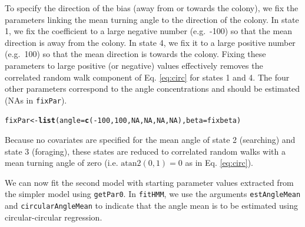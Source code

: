 \documentclass[12pt]{article}\usepackage[]{graphicx}\usepackage[]{color}
\makeatletter
\newcommand{\hlnum}[1]{\textcolor[rgb]{0.686,0.059,0.569}{#1}}%
\newcommand{\hlopt}[1]{\textcolor[rgb]{0,0,0}{#1}}%
\newcommand{\hlstd}[1]{\textcolor[rgb]{0.345,0.345,0.345}{#1}}%
\newcommand{\hlkwb}[1]{\textcolor[rgb]{0.69,0.353,0.396}{#1}}%
\newcommand{\hlkwc}[1]{\textcolor[rgb]{0.333,0.667,0.333}{#1}}%
\newcommand{\hlkwd}[1]{\textcolor[rgb]{0.737,0.353,0.396}{\textbf{#1}}}%
\newenvironment{kframe}{%
 \def\at@end@of@kframe{}%
 \ifinner\ifhmode%
  \def\at@end@of@kframe{\end{minipage}}%
  \begin{minipage}{\columnwidth}%
 \fi\fi%
 \def\FrameCommand##1{\hskip\@totalleftmargin \hskip-\fboxsep
 \colorbox{shadecolor}{##1}\hskip-\fboxsep
     \hskip-\linewidth \hskip-\@totalleftmargin \hskip\columnwidth}%
 \MakeFramed {\advance\hsize-\width
   \@totalleftmargin\z@ \linewidth\hsize
   \@setminipage}}%
 {\par\unskip\endMakeFramed%
 \at@end@of@kframe}
\newenvironment{knitrout}{}{} %
\makeatother
\begin{document}
To specify the direction of the bias (away from or towards the colony), we fix the parameters linking the mean turning angle to the direction of the colony. In state 1, we fix the coefficient to a large negative number (e.g.\ -100) so that the mean direction is away from the colony. In state 4, we fix it to a large positive number (e.g.\ 100) so that the mean direction is towards the colony. Fixing these parameters to large positive (or negative) values effectively removes the correlated random walk component of Eq. \ref{eq:circ} for states 1 and 4. The four other parameters correspond to the angle concentrations and should be estimated (NAs in \verb|fixPar|).
\begin{knitrout}
\color{fgcolor}\begin{kframe}
\begin{alltt}
\hlstd{fixPar} \hlkwb{<-} \hlkwd{list}\hlstd{(}\hlkwc{angle}\hlstd{=}\hlkwd{c}\hlstd{(}\hlopt{-}\hlnum{100}\hlstd{,}\hlnum{100}\hlstd{,}\hlnum{NA}\hlstd{,}\hlnum{NA}\hlstd{,}\hlnum{NA}\hlstd{,}\hlnum{NA}\hlstd{),}\hlkwc{beta}\hlstd{=fixbeta)}
\end{alltt}
\end{kframe}
\end{knitrout}
Because no covariates are specified for the mean angle of state 2 (searching) and state 3 (foraging), these states are reduced to correlated random walks with a mean turning angle of zero (i.e. $\text{atan2}(0,1)=0$ as in Eq. \ref{eq:circ}).

We can now fit the second model with starting parameter values extracted from the simpler model using \verb|getPar0|. In \verb|fitHMM|, we use the arguments \verb|estAngleMean| and \verb|circularAngleMean| to indicate that the angle mean is to be estimated using circular-circular regression.
\end{document}
